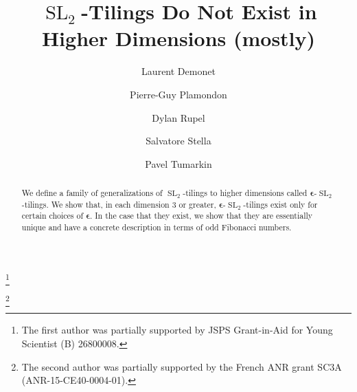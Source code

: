 \documentclass[11pt,reqno]{amsart}
\makeatletter
\newcommand{\monthyear}[1]{%
  \def\@monthyear{\uppercase{#1}}}
\newcommand{\volnumber}[1]{%
  \def\@volnumber{\uppercase{#1}}}
\newcommand{\bepsilon}{\boldsymbol{\epsilon}}
\newcommand{\SL}{\operatorname{SL}}
\makeatother
\begin{document}
\monthyear{Month Year}
\volnumber{Volume, Number}
\setcounter{page}{1}

\title{$\SL_2$-Tilings Do Not Exist in Higher Dimensions (mostly)}

\author[Demonet]{Laurent Demonet}
\address[Laurent Demonet]{Graduate School of Mathematics, Nagoya University, Furocho, Chikusaku, 464-8602 Nagoya, Japan}
\thanks{The first author was partially supported by JSPS Grant-in-Aid for Young Scientist (B) 26800008.}

\author[Plamondon]{Pierre-Guy Plamondon}
\address[Pierre-Guy Plamondon]{Laboratoire de Math\'ematiques d'Orsay, Univ. Paris-Sud, CNRS, Univ.
Paris-Saclay, 91405 Orsay, France.}
\thanks{The second author was partially supported by the French ANR grant SC3A (ANR-15-CE40-0004-01).}

\author[Rupel]{Dylan Rupel}
\address[Dylan Rupel]{Department of Mathematics, University of Notre Dame, Notre Dame, Indiana 46556, USA.}

\author[Stella]{Salvatore Stella}
\address[Salvatore Stella]{IN$d$AM - Marie Curie Actions fellow, Universit\`a ``La Sapienza'', Roma, Italy.}

\author[Tumarkin]{Pavel Tumarkin}
\address[Pavel Tumarkin]{Department of Mathematical Sciences, Durham University, South Road, Durham, DH1 3LE, UK.}

\begin{abstract}
  We define a family of generalizations of $\SL_2$-tilings to higher dimensions called $\bepsilon$-$\SL_2$-tilings.  
  We show that, in each dimension 3 or greater, $\bepsilon$-$\SL_2$-tilings exist only for certain choices of $\bepsilon$.  
  In the case that they exist, we show that they are essentially unique and have a concrete description in terms of odd Fibonacci numbers.
\end{abstract}

\maketitle
\end{document}
